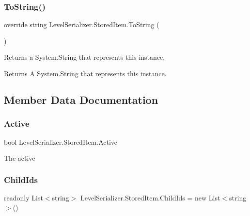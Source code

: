 \subsubsection{\texorpdfstring{To\+String()}{ToString()}}
{\footnotesize\ttfamily override string Level\+Serializer.\+Stored\+Item.\+To\+String (\begin{DoxyParamCaption}{ }\end{DoxyParamCaption})\hspace{0.3cm}{\ttfamily [inline]}}



Returns a System.\+String that represents this instance. 

\begin{DoxyReturn}{Returns}
A System.\+String that represents this instance.
\end{DoxyReturn}


\subsection{Member Data Documentation}
\mbox{\label{class_level_serializer_1_1_stored_item_a4b06764c8b12b1fa93f3998fff3cec43}} 
\subsubsection{\texorpdfstring{Active}{Active}}
{\footnotesize\ttfamily bool Level\+Serializer.\+Stored\+Item.\+Active}



The active 

\mbox{\label{class_level_serializer_1_1_stored_item_a1efb451e94bbf1f94e342e5a27482db6}} 
\subsubsection{\texorpdfstring{Child\+Ids}{ChildIds}}
{\footnotesize\ttfamily readonly List$<$string$>$ Level\+Serializer.\+Stored\+Item.\+Child\+Ids = new List$<$string$>$()}



